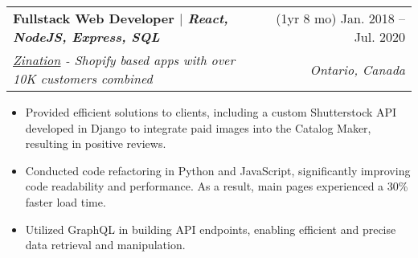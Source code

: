 \documentclass[letterpaper,11pt]{article}
\makeatletter
\newcommand{\resumeItem}[1]{
  \item\small{
    {#1 \vspace{-2pt}}
  }
}
\newcommand{\resumeSubheading}[4]{
  \vspace{-2pt}\item
    \begin{tabular*}{0.97\textwidth}[t]{l@{\extracolsep{\fill}}r}
      \textbf{#1} & #2 \\
      \textit{\small#3} & \textit{\small #4} \\
    \end{tabular*}\vspace{-7pt}
}
\newcommand{\resumeSubSubheading}[2]{
    \item
    \begin{tabular*}{0.97\textwidth}{l@{\extracolsep{\fill}}r}
      \textit{\small#1} & \textit{\small #2} \\
    \end{tabular*}\vspace{-7pt}
}
\newcommand{\resumeSubHeadingListEnd}{\end{itemize}}
\newcommand{\resumeItemListStart}{\begin{itemize}}
\newcommand{\resumeItemListEnd}{\end{itemize}\vspace{-5pt}}
\makeatother
\begin{document}
\resumeSubheading
{Fullstack Web Developer $|$ \normalfont \emph{React, NodeJS,  Express, SQL}}{(1yr 8 mo) Jan. 2018 -- Jul. 2020}
{\href{https://www.linkedin.com/company/zination/}{\underline{Zination}} - Shopify based apps with over 10K customers combined}{Ontario, Canada}
\resumeItemListStart
\resumeItem{Provided efficient solutions to clients, including a custom Shutterstock API developed in Django to integrate paid images into the Catalog Maker, resulting in positive reviews.}
\resumeItem{Conducted code refactoring in Python and JavaScript, significantly improving code readability and performance. As a result, main pages experienced a 30\% faster load time.}
\resumeItem{Utilized GraphQL in building API endpoints, enabling efficient and precise data retrieval and manipulation.}
\resumeItemListEnd




\end{document}
